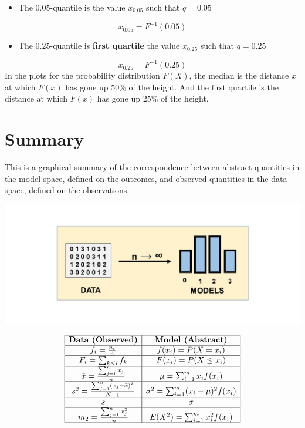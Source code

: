 \documentclass[
]{book}
\providecommand{\tightlist}{%
  \setlength{\itemsep}{0pt}\setlength{\parskip}{0pt}}
\begin{document}
\begin{itemize}
\tightlist
\item
  The \(0.05\)-quantile is the value \(x_{0.05}\) such that \(q=0.05\)
\end{itemize}

\[x_{0.05}=F^{-1}(0.05)\]

\begin{itemize}
\tightlist
\item
  The \(0.25\)-quantile is \textbf{first quartile} the value \(x_{0.25}\) such that \(q=0.25\)
\end{itemize}

\[x_{0.25}=F^{-1}(0.25)\]
In the plots for the probability distribution \(F(X)\), the median is the distance \(x\) at which \(F(x)\) has gone up \(50\%\) of the height. And the first quartile is the distance at which \(F(x)\) has gone up \(25\%\) of the height.

\hypertarget{summary}{%
\section{Summary}\label{summary}}

This is a graphical summary of the correspondence between abstract quantities in the model space, defined on the outcomes, and observed quantities in the data space, defined on the observations.

\includegraphics{./figures/randomvarsum.JPG}

\[
\begin{array}{|c|c|}
\hline
 \textbf{Data (Observed)} & \textbf{Model (Abstract)}  \\ 
\hline
 f_i=\frac{n_i}{n} &  f(x_i)=P(X=x_i) \\ 
\hline
 F_i=\sum_{k \leq i} f_k &  F(x_i)=P(X \leq x_i) \\ 
\hline
  \bar{x}=\frac{\sum_{j=1}^n x_j}{n} & \mu= \sum_{i=1}^m x_i f(x_i)\\ 
\hline
 s^2=\frac{\sum_{j=1}^n (x_j-\bar{x})^2}{N-1} & \sigma^2=\sum_{i=1}^m (x_i-\mu)^2 f(x_i) \\ 
\hline
 s & \sigma \\ 
\hline
 m_2=\frac{\sum_{j=1}^n x_j^2}{n} & E(X^2)=\sum_{i=1}^m x_i^2 f(x_i)  \\ 
\hline
\end{array}
\]
\end{document}
